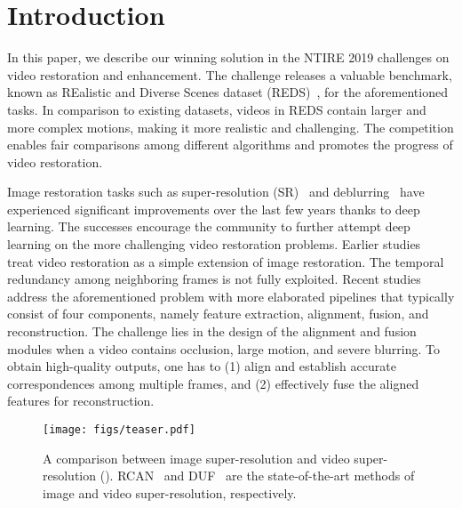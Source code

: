 \documentclass[10pt,twocolumn,letterpaper]{article}
\begin{document}
\section{Introduction}

In this paper, we describe our winning solution in the NTIRE 2019 challenges on video restoration and enhancement.
The challenge releases a valuable benchmark, known as REalistic and Diverse Scenes dataset (REDS)~\cite{Nah_2019_CVPR_Workshops_REDS}, for the aforementioned tasks. In comparison to existing datasets, videos in REDS contain larger and more complex motions, making it more realistic and challenging. The competition enables fair comparisons among different algorithms and promotes the progress of video restoration.

Image restoration tasks such as super-resolution (SR)~\cite{dong2014learning,lim2017enhanced,timofte2017ntire,ledig2017photo,wang2018recovering,zhang2018image} and deblurring~\cite{nah2017deep,kupyn2017deblurgan,tao2018scale} have experienced significant improvements over the last few years thanks to deep learning.
The successes encourage the community to further attempt deep learning on the more challenging video restoration problems.
Earlier studies~\cite{takeda2009super,dai2015dictionary,shahar2011space,liao2015video,kappeler2016video} treat video restoration as a simple extension of image restoration.
The temporal redundancy among neighboring frames is not fully exploited.
Recent studies~\cite{caballero2017real,xue2017video,tao2017detail,sajjadi2018frame} address the aforementioned problem with more elaborated pipelines that typically consist of four components, namely feature extraction, alignment, fusion, and reconstruction.
The challenge lies in the design of the alignment and fusion modules when a video contains occlusion, large motion,  and severe blurring. To obtain high-quality outputs, one has to (1) align and establish accurate correspondences among multiple frames, and (2) effectively fuse the aligned features for reconstruction.

\begin{figure}[!t]
    \begin{center}
        \texttt{[image: figs/teaser.pdf]}
        \vspace{-0.7cm}
        \caption{A comparison between image super-resolution and video super-resolution (). RCAN~\cite{zhang2018image} and DUF~\cite{jo2018deep} are the state-of-the-art methods of image and video super-resolution, respectively.}
        \label{fig:teaser}
        \vspace{-0.8cm}
    \end{center}
\end{figure}
\end{document}

